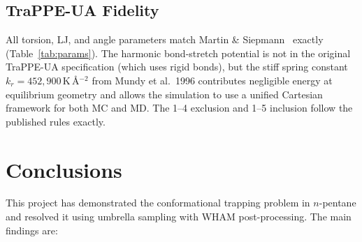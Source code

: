 \documentclass[12pt,a4paper]{article}
\begin{document}
\subsection{TraPPE-UA Fidelity}
All torsion, LJ, and angle parameters match Martin \& Siepmann~\citeyear{Martin1998}
exactly (Table~\ref{tab:params}).  The harmonic bond-stretch potential is
not in the original TraPPE-UA specification (which uses rigid bonds), but
the stiff spring constant $k_r = 452{,}900$\,K\,\AA$^{-2}$ from Mundy et
al.\ 1996 contributes negligible energy at equilibrium geometry and allows
the simulation to use a unified Cartesian framework for both MC and MD.
The 1--4 exclusion and 1--5 inclusion follow the published rules exactly.

\section{Conclusions}
\label{sec:conclusions}

This project has demonstrated the conformational trapping problem in
$n$-pentane and resolved it using umbrella sampling with WHAM
post-processing.  The main findings are:
\end{document}
